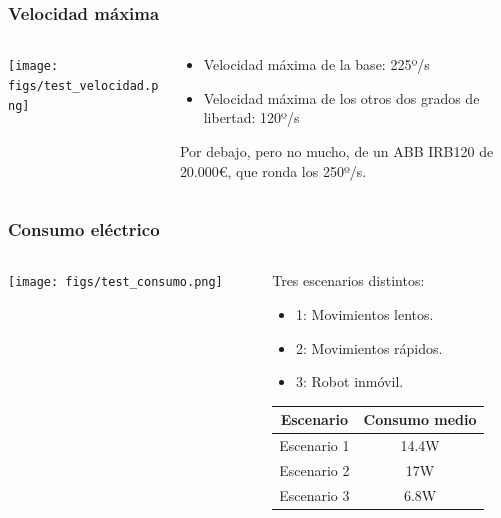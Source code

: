 \documentclass{beamer}
\begin{document}
\begin{frame}
  \frametitle{Velocidad máxima}
  \begin{columns}
    \begin{column}{0.35\textwidth} %
      \texttt{[image: figs/test\_velocidad.png]}
    \end{column}
    \begin{column}{0.5\textwidth} %
      
      \begin{itemize}
        \item Velocidad máxima de la base: 225º/s
        \item Velocidad máxima de los otros dos grados de libertad: 120º/s
      \end{itemize}

      Por debajo, pero no mucho, de un ABB IRB120 de 20.000\euro, que ronda los 
      250º/s.
      \end{column}
  \end{columns}
\end{frame}


\begin{frame}
  \frametitle{Consumo eléctrico}
  \begin{columns}
    \begin{column}{0.35\textwidth} %
      \texttt{[image: figs/test\_consumo.png]}
    \end{column}
    \begin{column}{0.5\textwidth} %
      
      Tres escenarios distintos:
      \begin{itemize}
        \item 1: Movimientos lentos.
        \item 2: Movimientos rápidos.
        \item 3: Robot inmóvil.
      \end{itemize}
      \begin{table}[H]
        \begin{center}
        \begin{tabular}{|c|c|}
        \hline
        \textbf{Escenario} & \textbf{Consumo medio}\\
        \hline
        Escenario 1 & 14.4W\\
        Escenario 2 & 17W\\
        Escenario 3 & 6.8W\\
        \hline
        \end{tabular}
        \end{center}
        \end{table}
      \end{column}
  \end{columns}
\end{frame}
\end{document}
